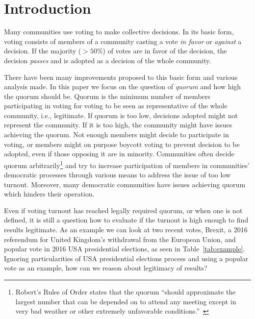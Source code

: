 \documentclass[chi_draft]{sigchi}
\begin{document}
\section{Introduction}

Many communities use voting to make collective decisions.
In its basic form, voting consists of members of a community casting a vote \emph{in favor} or \emph{against} a decision.
If the majority ($> 50\%$) of votes are in favor of the decision, the decision \emph{passes} and is adopted as a decision
of the whole community.

There have been many improvements proposed to this basic form and various analysis made.
In this paper we focus on the question of \emph{quorum} and how high the quorum should be.
Quorum is the minimum number of members participating in voting for voting to be seen as representative of the whole
community, i.e., legitimate.
If quorum is too low, decisions adopted might not represent the community.
If it is too high, the community might have issues achieving the quorum.
Not enough members might decide to participate in voting, or members might on purpose boycott voting to
prevent decision to be adopted, even if those opposing it are in minority.
Communities often decide quorum arbitrarily\footnote{Robert's Rules of Order states that the quorum
``should approximate the largest number that can be depended on to attend any meeting except in very bad weather
or other extremely unfavorable conditions.''~\cite{roberts}}
and try to increase participation of members in communities' democratic processes through various means
to address the issue of too low turnout.
Moreover, many democratic communities have issues achieving quorum which hinders their operation.

Even if voting turnout has reached legally required quorum, or when one is not defined,
it is still a question how to evaluate if the turnout is high enough to find results legitimate.
As an example we can look at two recent votes, Brexit, a 2016 referendum for United Kingdom's withdrawal
from the European Union, and popular vote in 2016 USA presidential elections, as seen in Table~\ref{tab:example}.
Ignoring particularities of USA presidential elections process and using a popular vote as an example,
how can we reason about legitimacy of results?
\end{document}
